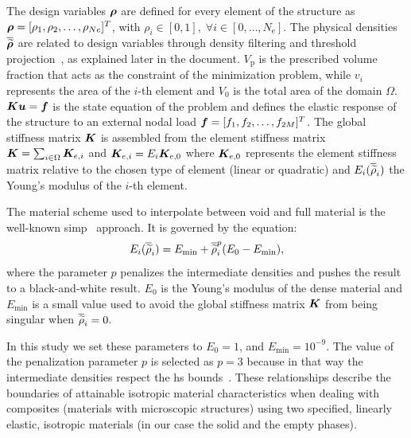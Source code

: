 The design variables $\bm{\rho}$ are defined for every element of the structure as $\bm{\rho} = [\rho_1, \rho_2, \ldots,\rho_{Ne}]^T$, with $\rho_i \in [0,1], \; \forall i \in [0,\dots,N_\text{e}]$. The physical densities $\bm{\overline{\widetilde{\rho}}}$ are related to design variables through density filtering and threshold projection~, as explained later in the document. $V_\text{p}$ is the prescribed volume fraction that acts as the constraint of the minimization problem, while $v_i$ represents the area of the $i$-th element and $V_0$ is the total area of the domain $\Omega$. $\bm{K}\bm{u} = \bm{f}$ is the state equation of the problem and defines the elastic response of the structure to an external nodal load $\bm{f}=[f_1, f_2, \ldots,f_{2M}]^T$. The global stiffness matrix $\bm{K}$ is assembled from the element stiffness matrix $\bm{K} = \sum_{i \in \Omega} \bm{K}_{e,i}$ and $\bm{K}_{e,i} = E_i \bm{K}_{e,0}$ where $\bm{K}_{e,0}$ represents the element stiffness matrix relative to the chosen type of element (linear or quadratic) and $E_i(\overline{\widetilde{\rho}}_i)$ the Young's modulus of the $i$-th element. 

The material scheme used to interpolate between void and full material is the well-known \gls{simp}~ approach. It is governed by the equation:
\begin{equation}
    E_i(\overline{\widetilde{\rho}}_i) = E_{\textrm{min}} + \overline{\widetilde{\rho}}_i^p(E_0-E_{\textrm{min}}),
    \label{eq:03_simp}
\end{equation}
where the parameter $p$ penalizes the intermediate densities and pushes the result to a black-and-white result. $E_0$ is the Young's modulus of the dense material and $E_{\textrm{min}}$ is a small value used to avoid the global stiffness matrix $\bm{K}$ from being singular when $\overline{\widetilde{\rho}}_i=0$. 

In this study we set these parameters to $E_0 = 1$, and $E_{\textrm{min}} = 10^{-9}$. The value of the penalization parameter $p$ is selected as $p=3$ because in that way the intermediate densities respect the \gls{hs} bounds~. These relationships describe the boundaries of attainable isotropic material characteristics when dealing with composites (materials with microscopic structures) using two specified, linearly elastic, isotropic materials (in our case the solid and the empty phases).
